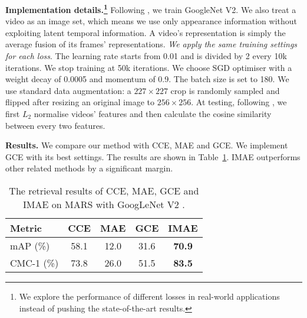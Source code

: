 \documentclass{article}
\begin{document}
\noindent
\textbf{Implementation details.\footnote{We explore the performance of different losses in real-world applications instead of pushing the state-of-the-art results.}}  Following \cite{liu2017qan,wang2019deep}, we train GoogleNet V2. We also treat a video as an image set, which means we use only appearance information without exploiting latent temporal information. 
A video's representation is simply the average fusion of its frames' representations.
\textit{We apply the same training settings for each loss}. The learning rate starts from 0.01 and is divided by 2 every 10k iterations. We stop training at 50k iterations. We choose SGD optimiser with a weight decay of 0.0005 and momentum of 0.9. The batch size is set to 180. We use standard data augmentation: a $227 \times 227$ crop is randomly sampled and flipped after resizing an original image to $256\times 256$. 
At testing, following \cite{wang2019deep,movshovitz2017no,law2017deep}, we first $L_2$ normalise videos' features and then calculate the cosine similarity between every two features.  


\noindent
\textbf{Results.} We compare our method with CCE, MAE and GCE. 
We implement GCE with its best settings. 
The results are shown in Table~\ref{table:MARS_ReID}. 
IMAE outperforms other related methods by a significant margin.




\begin{table}[!h]
\caption{
		The retrieval results of CCE, MAE, GCE and IMAE on MARS with GoogLeNet V2 \cite{ioffe2015batch}.
	}
	\centering
	\vspace{-0.2cm}
	\setlength{\tabcolsep}{6pt} \begin{tabular}{lcccc}
		\hline
		Metric & CCE & MAE & GCE & IMAE\\
		\hline
		mAP (\%) & 58.1 & 12.0 & 31.6 & \textbf{70.9}\\
		CMC-1 (\%) & 73.8 & 26.0 & 51.5 & \textbf{83.5}\\
		\hline
	\end{tabular}
	\label{table:MARS_ReID}
	\vspace{-0.3cm}
\end{table}
\end{document}
